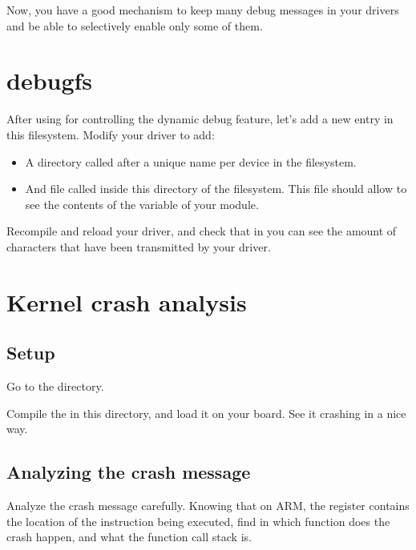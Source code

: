 Now, you have a good mechanism to keep many debug messages in your
drivers and be able to selectively enable only some of them.

\section{debugfs}

After using  for controlling the dynamic debug feature,
let's add a new entry in this filesystem. Modify your driver to
add:

\begin{itemize}

\item A directory called after a unique name per device in the
   filesystem.

\item And file called  inside this directory of the
   filesystem. This file should allow to see the
  contents of the  variable of your module.

\end{itemize}

Recompile and reload your driver, and check that in
 you can see the amount
of characters that have been transmitted by your driver.

\section{Kernel crash analysis}

\subsection{Setup}

Go to the 
directory.

Compile the  in this directory, and load it on your
board. See it crashing in a nice way.

\subsection{Analyzing the crash message}

Analyze the crash message carefully. Knowing that on ARM, the 
register contains the location of the instruction being executed, find
in which function does the crash happen, and what the function call
stack is.

